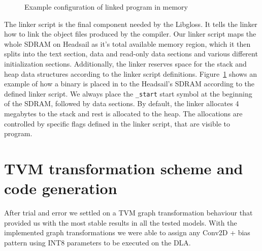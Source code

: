 \documentclass[12pt,a4paper,english
]{tunithesis}
\begin{document}
\begin{figure}[h]
\centering
{}
\caption{Example configuration of linked program in memory}
\label{fig:sdram-memory-layout}
\end{figure}

The linker script is the final component needed by the Libgloss. It tells the linker how to link the object files produced by the compiler. Our linker script maps the whole SDRAM on Headsail as it's total available memory region, which it then splits into the text section, data and read-only data sections and various different initialization sections. Additionally, the linker reserves space for the stack and heap data structures according to the linker script definitions. Figure~\ref{fig:sdram-memory-layout} shows an example of how a binary is placed in to the Headsail's SDRAM according to the defined linker script. We always place the \texttt{\_start} start symbol at the beginning of the SDRAM, followed by data sections. By default, the linker allocates 4 megabytes to the stack and rest is allocated to the heap. The allocations are controlled by specific flags defined in the linker script, that are visible to program.


\section{TVM transformation scheme and code generation}
After trial and error we settled on a TVM graph transformation behaviour that provided us with the most stable results in all the tested models. With the implemented graph transformations we were able to assign any Conv2D + bias pattern using INT8 parameters to be executed on the DLA.
\end{document}
